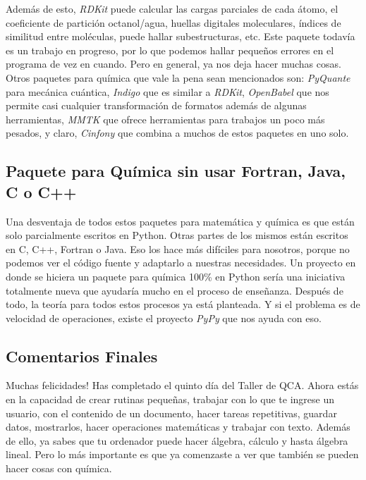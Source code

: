\documentclass[10pt,letterpaper]{article}
\begin{document}
Adem\'as de esto, \emph{RDKit} puede calcular las cargas parciales de cada \'atomo, el coeficiente de partici\'on octanol/agua, huellas digitales moleculares, \'indices de similitud entre mol\'eculas, puede hallar subestructuras, etc. Este paquete todav\'ia es un trabajo en progreso, por lo que podemos hallar peque\~nos errores en el programa de vez en cuando. Pero en general, ya nos deja hacer muchas cosas.\\

Otros paquetes para qu\'imica que vale la pena sean mencionados son: \emph{PyQuante} para mec\'anica cu\'antica, \emph{Indigo} que es similar a \emph{RDKit}, \emph{OpenBabel} que nos permite casi cualquier transformaci\'on de formatos adem\'as de algunas herramientas, \emph{MMTK} que ofrece herramientas para trabajos un poco m\'as pesados, y claro, \emph{Cinfony} que combina a muchos de estos paquetes en uno solo.

\subsection{Paquete para Qu\'imica sin usar Fortran, Java, C o C++}
Una desventaja de todos estos paquetes para matem\'atica y qu\'imica es que est\'an solo parcialmente escritos en Python. Otras partes de los mismos est\'an escritos en C, C++, Fortran o Java. Eso los hace m\'as dif\'iciles para nosotros, porque no podemos ver el c\'odigo fuente y adaptarlo a nuestras necesidades. Un proyecto en donde se hiciera un paquete para qu\'imica 100\% en Python ser\'ia una iniciativa totalmente nueva que ayudar\'ia mucho en el proceso de ense\~nanza. Despu\'es de todo, la teor\'ia para todos estos procesos ya est\'a planteada. Y si el problema es de velocidad de operaciones, existe el proyecto \emph{PyPy} que nos ayuda con eso.

\newpage

\subsection{Comentarios Finales}
Muchas felicidades! Has completado el quinto d\'ia del Taller de QCA. Ahora est\'as en la capacidad de crear rutinas peque\~nas, trabajar con lo que te ingrese un usuario, con el contenido de un documento, hacer tareas repetitivas, guardar datos, mostrarlos, hacer operaciones matem\'aticas y trabajar con texto. Adem\'as de ello, ya sabes que tu ordenador puede hacer \'algebra, c\'alculo y hasta \'algebra lineal. Pero lo m\'as importante es que ya comenzaste a ver que tambi\'en se pueden hacer cosas con qu\'imica.\\
\end{document}
